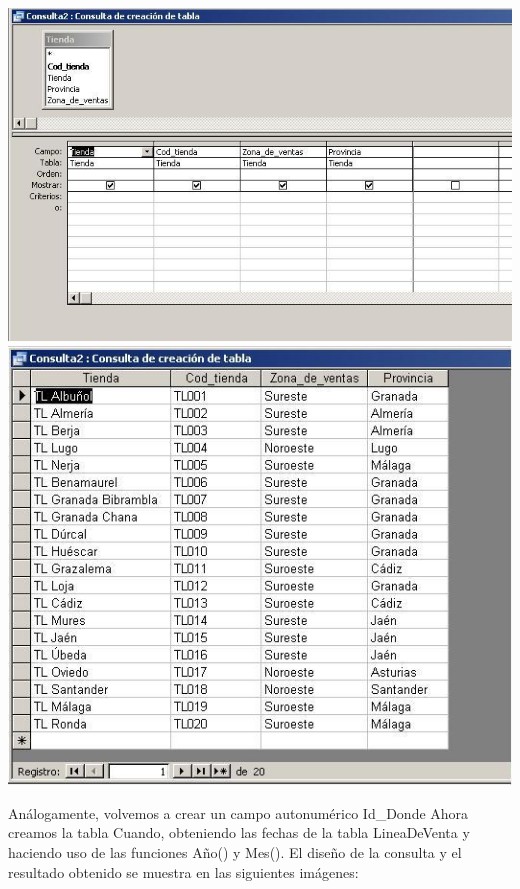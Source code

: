 \documentclass[paper=a4, fontsize=11pt, spanish]{scrartcl}
\numberwithin{equation}{section} %
\numberwithin{figure}{section} %
\numberwithin{table}{section} %
\begin{document}
\begin{center}
	\includegraphics[scale=0.6]{3.JPG}
	\includegraphics[scale=0.6]{4.JPG}
\end{center}
Análogamente, volvemos a crear un campo autonumérico Id\_Donde
Ahora creamos la tabla Cuando, obteniendo las fechas de la tabla LineaDeVenta y haciendo uso de las funciones Año() y Mes().
El diseño de la consulta y el resultado obtenido se muestra en las siguientes imágenes: 
\end{document}
